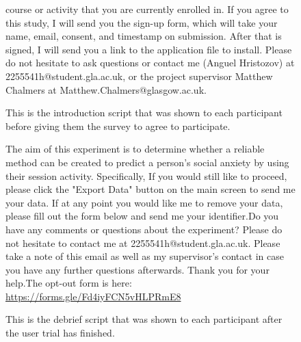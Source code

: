 \documentclass{l4proj}
\begin{document}
\begin{appendices}
\begin{figure}[htb]
course or activity that you are currently enrolled in. If you agree to this study, I will send you the sign-up form, which will take your name, email, consent, and timestamp on submission. After that is signed, I will send you a link to the application file to install. Please do not hesitate to ask questions or contact me (Anguel Hristozov) at 2255541h@student.gla.ac.uk, or the project supervisor Matthew Chalmers at Matthew.Chalmers@glasgow.ac.uk.
    \caption{This is the introduction script that was shown to each participant before giving them the survey to agree to participate.}
    \label{fig:intro_script} 
\end{figure}


\begin{figure}[htb]
The aim of this experiment is to determine whether a reliable method can be created to predict a person’s social anxiety by using their session activity. Specifically,  If you would still like to proceed, please click the "Export Data" button on the main screen to send me your data. If at any point you would like me to remove your data, please fill out the form below and send me your identifier.\newline\newline Do you have any comments or questions about the experiment? Please do not hesitate to contact me at 2255541h@student.gla.ac.uk. Please take a note of this email as well as my supervisor's contact in case you have any further questions afterwards. Thank you for your help.\newline\newline The opt-out form is here: \url{https://forms.gle/Fd4iyFCN5vHLPRmE8}
    \caption{This is the debrief script that was shown to each participant after the user trial has finished.}
    \label{fig:debrief_script} 
\end{figure}


\end{appendices}
\end{document}
